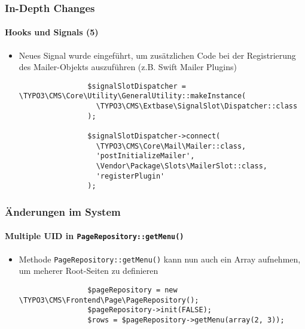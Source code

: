 \begin{frame}[fragile]
	\frametitle{In-Depth Changes}
	\framesubtitle{Hooks und Signals (5)}

	\lstset{basicstyle=\tiny\ttfamily}

	\begin{itemize}

		\item Neues Signal wurde eingeführt, um zusätzlichen Code bei der
			Registrierung des Mailer-Objekts auszuführen (z.B. Swift
			Mailer Plugins)

			\begin{lstlisting}
				$signalSlotDispatcher = \TYPO3\CMS\Core\Utility\GeneralUtility::makeInstance(
				  \TYPO3\CMS\Extbase\SignalSlot\Dispatcher::class
				);

				$signalSlotDispatcher->connect(
				  \TYPO3\CMS\Core\Mail\Mailer::class,
				  'postInitializeMailer',
				  \Vendor\Package\Slots\MailerSlot::class,
				  'registerPlugin'
				);
		\end{lstlisting}

	\end{itemize}

\end{frame}


\begin{frame}[fragile]
	\frametitle{Änderungen im System}
	\framesubtitle{Multiple UID in \texttt{PageRepository::getMenu()}}

	\begin{itemize}


		\item Methode \texttt{PageRepository::getMenu()} kann nun auch ein
			Array aufnehmen, um meherer Root-Seiten zu definieren

			\begin{lstlisting}
				$pageRepository = new \TYPO3\CMS\Frontend\Page\PageRepository();
				$pageRepository->init(FALSE);
				$rows = $pageRepository->getMenu(array(2, 3));
			\end{lstlisting}

	\end{itemize}

\end{frame}

